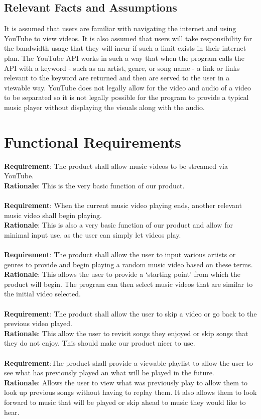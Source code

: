\documentclass[12pt, titlepage]{article}
\begin{document}
\subsection{Relevant Facts and Assumptions}
It is assumed that users are familiar with navigating the internet and using YouTube to view videos. It is also assumed that users will take responsibility for the bandwidth usage that they will incur if such a limit exists in their internet plan. The YouTube API works in such a way that when the program calls the API with a keyword - such as an artist, genre, or song name - a link or links relevant to the keyword are returned and then are served to the user in a viewable way. YouTube does not legally allow for the video and audio of a video to be separated so it is not legally possible for the program to provide a typical music player without displaying the visuals along with the audio.

\section{Functional Requirements}

\textbf{Requirement}: The product shall allow music videos to be streamed via YouTube.\\
\textbf{Rationale}: This is the very basic function of our product.\\\\
\textbf{Requirement}: When the current music video playing ends, another relevant music video shall begin playing.\\
\textbf{Rationale}: This is also a very basic function of our product and allow for minimal input use, as the user can simply let videos play.\\\\
\textbf{Requirement}: The product shall allow the user to input various artists or genres to provide and begin playing a random music video based on these terms.\\
\textbf{Rationale}: This allows the user to provide a ‘starting point’ from which the product will begin.  The program can then select music videos that are similar to the initial video selected.\\\\
\textbf{Requirement}: The product shall allow the user to skip a video or go back to the previous video played.\\
\textbf{Rationale}: This allow the user to revisit songs they enjoyed or skip songs that they do not enjoy.  This should make our product nicer to use.\\\\
\textbf{Requirement}:The product shall provide a viewable playlist to allow the user to see what has previously played an what will be played in the future.\\
\textbf{Rationale}: Allows the user to view what was previously play to allow them to look up previous songs without having to replay them. It also allows them to look forward to music that will be played or skip ahead to music they would like to hear.
\end{document}
